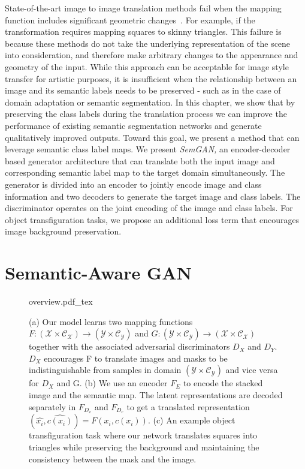 State-of-the-art image to image translation methods fail when the mapping function includes significant geometric changes~\cite{zhu_unpaired_2017}. For example, if the transformation requires mapping squares to skinny triangles.
This failure is because these methods do not take the underlying representation of the scene into consideration, and therefore make arbitrary changes to the appearance and geometry of the input. While this approach can be acceptable for image style transfer for artistic purposes, it is insufficient when the relationship between an image and its semantic labels needs to be preserved - such as in the case of domain adaptation or semantic segmentation. In this chapter, we show that by preserving the class labels during the translation process we can improve the performance of existing semantic segmentation networks and generate qualitatively improved outputs.
Toward this goal, we present a method that can leverage semantic class label maps. We present \emph{SemGAN,} an encoder-decoder based generator architecture that can translate both the input image and corresponding semantic label map to the target domain simultaneously. The generator is divided into an encoder to jointly encode image and class information and two decoders to generate the target image and class labels. The discriminator operates on the joint encoding of the image and class labels. For object transfiguration tasks, we propose an additional loss term that encourages image background preservation.

\section{Semantic-Aware GAN}\label{sec:formulation}
\begin{figure*}[!hbpt]
    \centering
    \def\svgwidth{\textwidth}
    {overview.pdf_tex}
    \caption[Schematic diagram of semantic-aware Generative Adversarial Network (GAN)]{ (a) Our model learns two mapping functions $F: (\mathcal{X \times C_X}) \to (\mathcal{Y \times C_Y})$ and $G: (\mathcal{Y \times C_Y}) \to (\mathcal{X \times C_X})$ together with the associated adversarial discriminators $D_X$ and $D_Y$. $D_X$ encourages F to translate images and masks to be indistinguishable from samples in domain $(\mathcal{Y \times C_Y})$ and vice versa for $D_X$ and G. (b) We use an encoder $F_E$ to encode the stacked image and the semantic map. The latent representations are decoded separately in $F_{D_x}$ and $F_{D_c}$ to get a translated representation $(\widehat{x_i},\widehat{c(x_i)}) = F(x_i, c(x_i))$. (c) An example object transfiguration task where our network translates squares into triangles while preserving the background and maintaining the consistency between the mask and the image.}
    \label{fig:overview_semgan}
\end{figure*}

